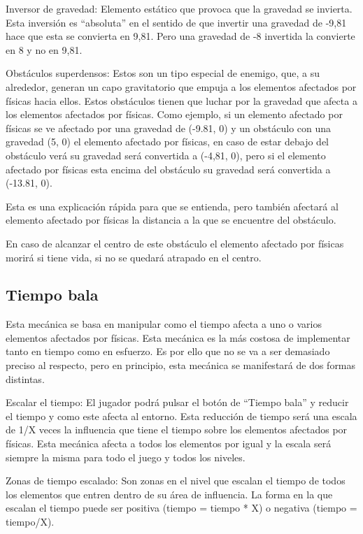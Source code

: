 Inversor de gravedad: Elemento estático que provoca que la gravedad se invierta. Esta inversión es “absoluta” en el sentido de que invertir una gravedad de -9,81 hace que esta se convierta en 9,81. Pero una gravedad de -8 invertida la convierte en 8 y no en 9,81.

Obstáculos superdensos: Estos son un tipo especial de enemigo, que, a su alrededor, generan un capo gravitatorio que empuja a los elementos afectados por físicas hacia ellos. Estos obstáculos tienen que luchar por la gravedad que afecta a los elementos afectados por físicas. Como ejemplo, si un elemento afectado por físicas se ve afectado por una gravedad de (-9.81, 0) y un obstáculo con una gravedad (5, 0) el elemento afectado por físicas, en caso de estar debajo del obstáculo verá su gravedad será convertida a (-4,81, 0), pero si el elemento afectado por físicas esta encima del obstáculo su gravedad será convertida a (-13.81, 0).

Esta es una explicación rápida para que se entienda, pero también afectará al elemento afectado por físicas la distancia a la que se encuentre del obstáculo.

En caso de alcanzar el centro de este obstáculo el elemento afectado por físicas morirá si tiene vida, si no se quedará atrapado en el centro.

\subsection{Tiempo bala}
Esta mecánica se basa en manipular como el tiempo afecta a uno o varios elementos afectados por físicas. Esta mecánica es la más costosa de implementar tanto en tiempo como en esfuerzo. Es por ello que no se va a ser demasiado preciso al respecto, pero en principio, esta mecánica se manifestará de dos formas distintas.

Escalar el tiempo: El jugador podrá pulsar el botón de “Tiempo bala” y reducir el tiempo y como este afecta al entorno. Esta reducción de tiempo será una escala de 1/X veces la influencia que tiene el tiempo sobre los elementos afectados por físicas. Esta mecánica afecta a todos los elementos por igual y la escala será siempre la misma para todo el juego y todos los niveles.

Zonas de tiempo escalado: Son zonas en el nivel que escalan el tiempo de todos los elementos que entren dentro de su área de influencia. La forma en la que escalan el tiempo puede ser positiva (tiempo = tiempo * X) o negativa (tiempo = tiempo/X).

